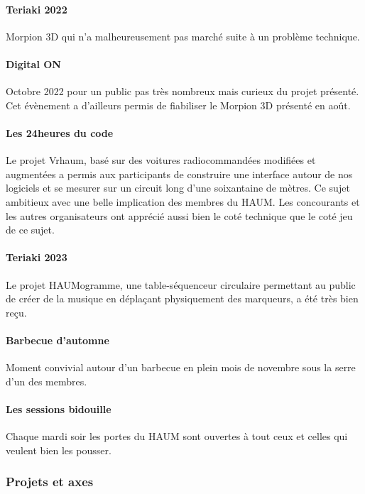 \documentclass[11pt]{article}
\begin{document}
\paragraph{Teriaki 2022} Morpion 3D qui n'a malheureusement pas marché suite à un problème technique.

\paragraph{Digital ON} Octobre 2022 pour un public pas très nombreux mais curieux du projet présenté. Cet évènement a d'ailleurs permis de fiabiliser le Morpion 3D présenté en août.

\paragraph{Les 24heures du code} Le projet Vrhaum, basé sur des voitures radiocommandées modifiées et augmentées a permis aux participants de construire une interface autour de nos logiciels et se mesurer sur un circuit long d'une soixantaine de mètres. Ce sujet ambitieux avec une belle implication des membres du HAUM. Les concourants et les autres organisateurs ont apprécié aussi bien le coté technique que le coté jeu de ce sujet.

\paragraph{Teriaki 2023} Le projet HAUMogramme, une table-séquenceur circulaire permettant au public de créer de la musique en déplaçant physiquement des marqueurs, a été très bien reçu.

\paragraph{Barbecue d’automne} Moment convivial autour d'un barbecue en plein mois de novembre sous la serre d'un des membres.

\paragraph{Les sessions bidouille} Chaque mardi soir les portes du HAUM sont ouvertes à tout ceux et celles qui veulent bien les pousser.

\subsubsection{Projets et axes}
\end{document}
